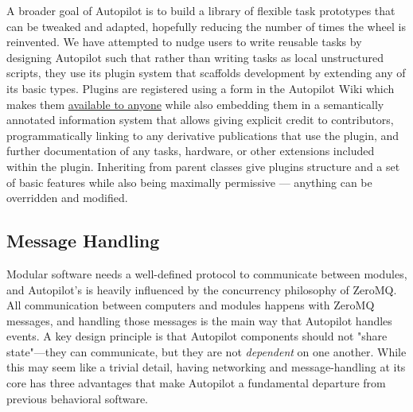 A broader goal of Autopilot is to build a library of flexible task prototypes that can be tweaked and adapted, hopefully reducing the number of times the wheel is reinvented. We have attempted to nudge users to write reusable tasks by designing Autopilot such that rather than writing tasks as local unstructured scripts, they use its plugin system that scaffolds development by extending any of its basic types. Plugins are registered using a form in the Autopilot Wiki which makes them \href{https://wiki.auto-pi-lot.com/index.php/Autopilot_Plugins}{available to anyone} while also embedding them in a semantically annotated information system that allows giving explicit credit to contributors, programmatically linking to any derivative publications that use the plugin, and further documentation of any tasks, hardware, or other extensions included within the plugin. Inheriting from parent classes give plugins structure and a set of basic features while also being maximally permissive --- anything can be overridden and modified.

\subsection{Message Handling}
\label{sec:message_handling}

Modular software needs a well-defined protocol to communicate between modules, and Autopilot's is heavily influenced by the concurrency philosophy of ZeroMQ\citep{hintjensZeroMQMessagingMany2013}. All communication between computers and modules happens with ZeroMQ messages, and handling those messages is the main way that Autopilot handles events. A key design principle is that Autopilot components should not "share state"---they can communicate, but they are not \textit{dependent} on one another. While this may seem like a trivial detail, having networking and message-handling at its core has three advantages that make Autopilot a fundamental departure from previous behavioral software.

